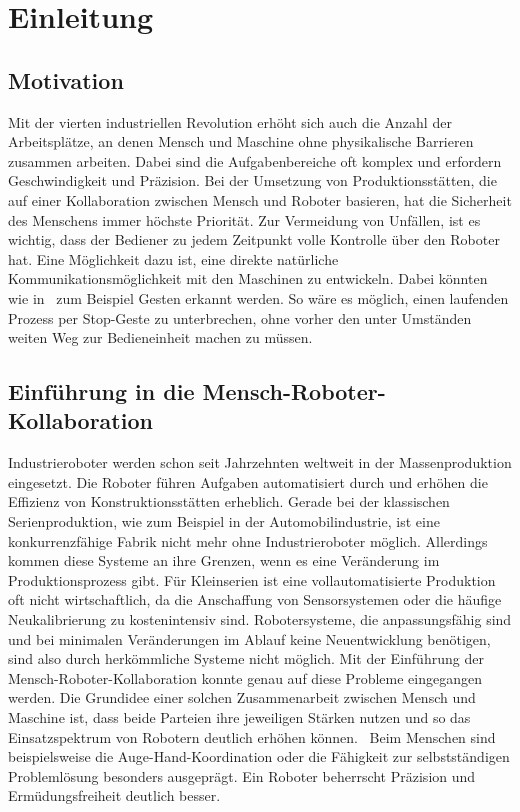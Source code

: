 \chapter{Einleitung}

\section{Motivation}
Mit der vierten industriellen Revolution erhöht sich auch die Anzahl der Arbeitsplätze, an denen Mensch und Maschine ohne physikalische Barrieren zusammen arbeiten. Dabei sind die Aufgabenbereiche oft komplex und erfordern Geschwindigkeit und Präzision. Bei der Umsetzung von Produktionsstätten, die auf einer Kollaboration zwischen Mensch und Roboter basieren, hat die Sicherheit des Menschens immer höchste Priorität. Zur Vermeidung von Unfällen, ist es wichtig, dass der Bediener zu jedem Zeitpunkt volle Kontrolle über den Roboter hat. Eine Möglichkeit dazu ist, eine direkte natürliche Kommunikationsmöglichkeit mit den Maschinen zu entwickeln. Dabei könnten wie in~\cite{flexibleSystem} zum Beispiel Gesten erkannt werden. So wäre es möglich, einen laufenden Prozess per Stop-Geste zu unterbrechen, ohne vorher den unter Umständen weiten Weg zur Bedieneinheit machen zu müssen.   

\section{Einführung in die Mensch-Roboter-Kollaboration}
Industrieroboter werden schon seit Jahrzehnten weltweit in der Massenproduktion eingesetzt. Die Roboter führen Aufgaben automatisiert durch und erhöhen die Effizienz von Konstruktionsstätten erheblich. Gerade bei der klassischen Serienproduktion, wie zum Beispiel in der Automobilindustrie, ist eine konkurrenzfähige Fabrik nicht mehr ohne Industrieroboter möglich. Allerdings kommen diese Systeme an ihre Grenzen, wenn es eine Veränderung im Produktionsprozess gibt. Für Kleinserien ist eine vollautomatisierte Produktion oft nicht wirtschaftlich, da die Anschaffung von Sensorsystemen oder die häufige Neukalibrierung zu kostenintensiv sind. Robotersysteme, die anpassungsfähig sind und bei minimalen Veränderungen im Ablauf keine Neuentwicklung benötigen, sind also durch herkömmliche Systeme nicht möglich. Mit der Einführung der Mensch-Roboter-Kollaboration konnte genau auf diese Probleme eingegangen werden. Die Grundidee einer solchen Zusammenarbeit zwischen Mensch und Maschine ist, dass beide Parteien ihre jeweiligen Stärken nutzen und so das Einsatzspektrum von Robotern deutlich erhöhen können.~\cite{ObererTreitz.2019} Beim Menschen sind beispielsweise die Auge-Hand-Koordination oder die Fähigkeit zur selbstständigen Problemlösung besonders ausgeprägt. Ein Roboter beherrscht Präzision und Ermüdungsfreiheit deutlich besser.~\cite{fraunhoferMRK}

